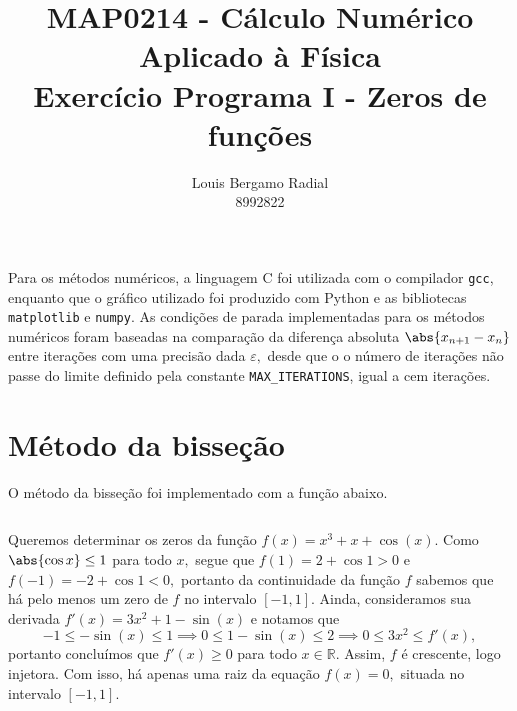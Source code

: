 \documentclass[portuguese,minted]{artigo}
\author{Louis Bergamo Radial\\8992822}
\title{MAP0214 - Cálculo Numérico Aplicado à Física\\Exercício Programa I - Zeros de funções}
\begin{document}
    \maketitle
    Para os métodos numéricos, a linguagem C foi utilizada com o compilador \verb|gcc|, enquanto que o gráfico utilizado foi produzido com Python e as bibliotecas \verb|matplotlib| e \verb|numpy|. As condições de parada implementadas para os métodos numéricos foram baseadas na comparação  da diferença absoluta \(\abs{x_{n+1} - x_n}\) entre iterações com uma precisão dada \(\varepsilon,\) desde que o o número de iterações não passe do limite definido pela constante \verb|MAX_ITERATIONS|, igual a cem iterações.

    \section{Método da bisseção}
    O método da bisseção foi implementado com a função abaixo.
    \inputminted[firstline=11,lastline=36]{c}{src/main.c}

    Queremos determinar os zeros da função \(f(x) = x^3 + x + \cos(x).\) Como \(\abs{\cos{x}} \leq 1\) para todo \(x,\) segue que \(f(1) = 2 + \cos1 > 0\) e \(f(-1) = -2 + \cos1 < 0,\) portanto da continuidade da função \(f\) sabemos que há pelo menos um zero de \(f\) no intervalo \([-1,1].\) Ainda, consideramos sua derivada \(f'(x) = 3x^2 + 1 - \sin(x)\) e notamos que
    \begin{equation*}
        -1 \leq -\sin(x) \leq 1 \implies 0 \leq 1 - \sin(x) \leq 2 \implies 0 \leq 3x^2 \leq f'(x),
    \end{equation*}
    portanto concluímos que \(f'(x) \geq 0\) para todo \(x \in \mathbb{R}.\) Assim, \(f\) é crescente, logo injetora. Com isso, há apenas uma raiz da equação \(f(x) = 0,\) situada no intervalo \([-1,1]\).
\end{document}
